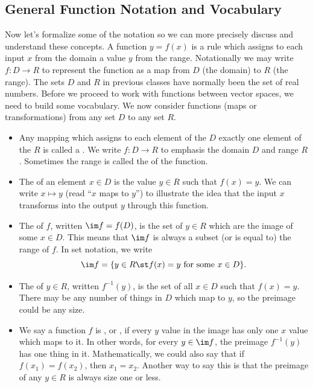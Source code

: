\subsection{General Function Notation and Vocabulary}
Now let's formalize some of the notation so we can more precisely
discuss and understand these concepts.
A function $y=f(x)$ is a rule which assigns to each input $x$ from the domain a value $y$ from the range. 
Notationally we may write $f:D\to R$ to represent the function as a map from $D$ (the domain) to $R$ (the range).  
The sets $D$ and $R$ in previous classes have normally been the set of real numbers. 
Before we proceed to work with functions between vector spaces, we need to build some vocabulary. 
We now consider functions (maps or transformations) from any set $D$ to any set $R$.
\begin{definition}
  \begin{itemize}
  \item Any mapping which assigns to each element of the  $D$ exactly one element of the  $R$ is called a . We write $f:D\to R$ to emphasis the domain $D$ and range $R$.  Sometimes the range is called the  of the function.

  \item The  of an element $x\in D$ is the value $y\in R$ such that $f(x)=y$. We can write $x\mapsto y$ (read ``$x$ maps to $y$'') to illustrate the idea that the input $x$ transforms into the output $y$ through this function.

  \item The  of $f$, written $\im f=f(D)$, is the set of $y\in R$ which are the image of some $x\in D$.  This means that $\im f$ is always a subset (or is equal to) the range of $f$.  In set notation, we write $$\im f = \{y\in R \st f(x)=y \text{ for some $x\in D$}\}.$$

  \item The  of $y\in R$, written $f^{-1}(y)$, is the set of all $x\in D$ such that $f(x)=y$.  There may be any number of things in $D$ which map to $y$, so the preimage could be any size.
	
  \item We say a function $f$ is , or , if every $y$ value in the image has only one $x$ value which maps to it.  In other words, for every $y\in \im f$, the preimage $f^{-1}(y)$ has one thing in it.  Mathematically, we could also say that if $f(x_1)=f(x_2)$, then $x_1=x_2$.  Another way to say this is that the preimage of any $y\in R$ is always size one or less.


\end{itemize}
\end{definition}
